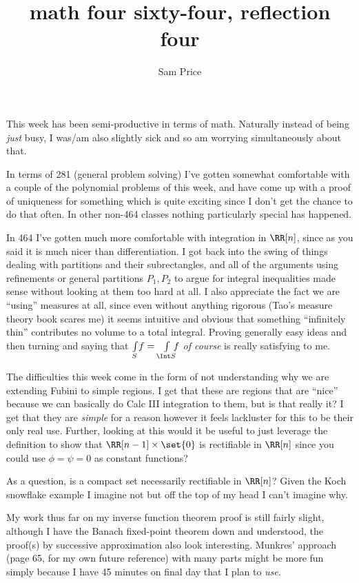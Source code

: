 \documentclass[12pt]{article}
\author{Sam Price}
\date{}
\title{math four sixty-four, reflection four}
\begin{document}
\maketitle

This week has been semi-productive in terms of math. Naturally instead of being \emph{just} busy, I was/am also slightly sick and so am worrying simultaneously about that.

In terms of 281 (general problem solving) I've gotten somewhat comfortable with a couple of the polynomial problems of this week, and have come up with a proof of uniqueness for something
which is quite exciting since I don't get the chance to do that often. In other non-464 classes nothing particularly special has happened.

In 464 I've gotten much more comfortable with integration in $\RR[n]$,
since as you said it is much nicer than differentiation.
I got back into the swing of things dealing with partitions and their subrectangles,
and all of the arguments using refinements or general partitions $P_{1},P_{2}$ to argue
for integral inequalities made sense without looking at them too hard at all.
I also appreciate the fact we are ``using'' measures at all, since even without anything rigorous
(Tao's measure theory book scares me) it seems intuitive and obvious that something ``infinitely thin''
contributes no volume to a total integral. Proving generally easy ideas and then turning and saying
that $\int\limits_{S}\! f = \int\limits_{\Int S}\!\!\! f$ \emph{of course} is really satisfying to me.

The difficulties this week come in the form of not understanding why we are extending Fubini to
simple regions. I get that these are regions that are ``nice'' because we can basically do Calc III
integration to them, but is that really it? I get that they are \emph{simple} for a reason however it
feels lackluster for this to be their only real use.
Further, looking at this would it be useful to just leverage the definition to show that $\RR[n - 1] \times \set{0}$
is rectifiable in $\RR[n]$ since you could use $\phi = \psi = 0$ as constant functions?

As a question, is a compact set necessarily rectifiable in $\RR[n]$?
Given the Koch snowflake example I imagine not but off the top of my head I can't imagine why.

My work thus far on my inverse function theorem proof is still fairly slight,
although I have the Banach fixed-point theorem down and understood,
the proof(s) by successive approximation also look interesting.
Munkres' approach (page 65, for my own future reference)
with many parts might be more fun simply because I have 45 minutes on final day that I plan to \emph{use}.
\end{document}
